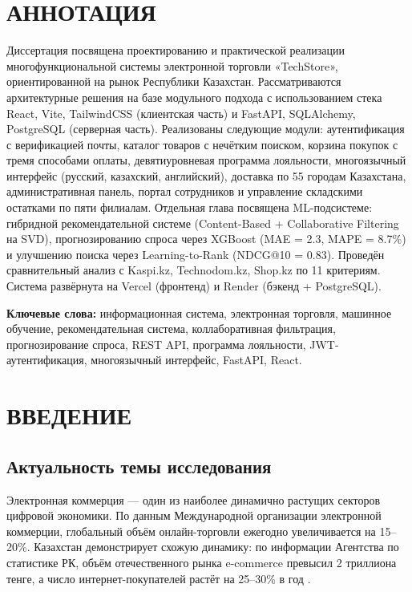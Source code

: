 \documentclass[14pt,a4paper]{extreport}
\begin{document}
\chapter*{АННОТАЦИЯ}

Диссертация посвящена проектированию и практической реализации многофункциональной системы электронной торговли «TechStore», ориентированной на рынок Республики Казахстан. Рассматриваются архитектурные решения на базе модульного подхода с использованием стека React, Vite, TailwindCSS (клиентская часть) и FastAPI, SQLAlchemy, PostgreSQL (серверная часть). Реализованы следующие модули: аутентификация с верификацией почты, каталог товаров с нечётким поиском, корзина покупок с тремя способами оплаты, девятиуровневая программа лояльности, многоязычный интерфейс (русский, казахский, английский), доставка по 55 городам Казахстана, административная панель, портал сотрудников и управление складскими остатками по пяти филиалам. Отдельная глава посвящена ML-подсистеме: гибридной рекомендательной системе (Content-Based + Collaborative Filtering на SVD), прогнозированию спроса через XGBoost (MAE = 2.3, MAPE = 8.7\%) и улучшению поиска через Learning-to-Rank (NDCG@10 = 0.83). Проведён сравнительный анализ с Kaspi.kz, Technodom.kz, Shop.kz по 11 критериям. Система развёрнута на Vercel (фронтенд) и Render (бэкенд + PostgreSQL).

\textbf{Ключевые слова:} информационная система, электронная торговля, машинное обучение, рекомендательная система, коллаборативная фильтрация, прогнозирование спроса, REST API, программа лояльности, JWT-аутентификация, многоязычный интерфейс, FastAPI, React.

{
  \renewcommand{\contentsname}{ОГЛАВЛЕНИЕ}
  \tableofcontents
}

\chapter{ВВЕДЕНИЕ}

\section{Актуальность темы исследования}

Электронная коммерция — один из наиболее динамично растущих секторов цифровой экономики. По данным Международной организации электронной коммерции, глобальный объём онлайн-торговли ежегодно увеличивается на 15--20\%. Казахстан демонстрирует схожую динамику: по информации Агентства по статистике РК, объём отечественного рынка e-commerce превысил 2 триллиона тенге, а число интернет-покупателей растёт на 25--30\% в год \cite{ecommerce2023}.
\end{document}
